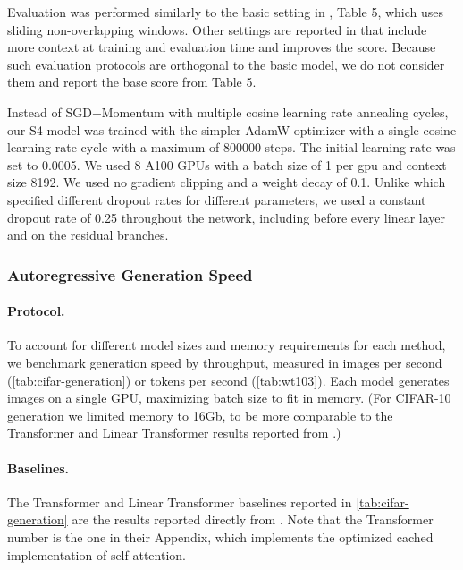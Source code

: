 \documentclass{article}
\newcommand{\methodabbrv}{S4}
\begin{document}
Evaluation was performed similarly to the basic setting in \citep{baevski2018adaptive}, Table 5,
which uses sliding non-overlapping windows.
Other settings are reported in \citep{baevski2018adaptive} that include more context at training and evaluation time and improves the score.
Because such evaluation protocols are orthogonal to the basic model, we do not consider them and report the base score from \citep{baevski2018adaptive} Table 5.

Instead of SGD+Momentum with multiple cosine learning rate annealing cycles,
our \methodabbrv{} model was trained with the simpler AdamW optimizer with a single cosine learning rate cycle with a maximum of 800000 steps.
The initial learning rate was set to 0.0005.
We used 8 A100 GPUs with a batch size of 1 per gpu and context size 8192.
We used no gradient clipping and a weight decay of 0.1.
Unlike \citep{baevski2018adaptive} which specified different dropout rates for different parameters,
we used a constant dropout rate of 0.25 throughout the network, including before every linear layer and on the residual branches.


\subsubsection{Autoregressive Generation Speed}
\label{sec:experiment-details-general-speed}

\paragraph{Protocol.}
To account for different model sizes and memory requirements for each method,
we benchmark generation speed by throughput,
measured in images per second (\cref{tab:cifar-generation}) or tokens per second (\cref{tab:wt103}).
Each model generates images on a single  GPU,
maximizing batch size to fit in memory.
(For CIFAR-10 generation we limited memory to 16Gb, to be more comparable to the Transformer and Linear Transformer results reported from \citep{katharopoulos2020transformers}.)

\paragraph{Baselines.}
The Transformer and Linear Transformer baselines reported in \cref{tab:cifar-generation} are the results reported directly from \citet{katharopoulos2020transformers}.
Note that the Transformer number is the one in their Appendix, which implements the optimized cached implementation of self-attention.
\end{document}
